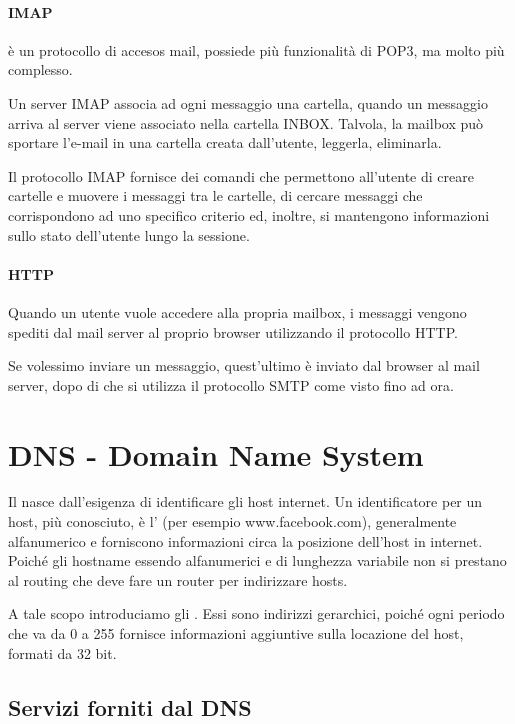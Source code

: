 \documentclass{book}
\newcommand{\tmtextbf}[1]{\text{{\bfseries{#1}}}}
\begin{document}
\paragraph{IMAP}

\tmtextbf{IMAP} {\`e} un protocollo di accesos mail, possiede pi{\`u}
funzionalit{\`a} di POP3, ma molto pi{\`u} complesso.

Un server IMAP associa ad ogni messaggio una cartella, quando un messaggio
arriva al server viene associato nella cartella INBOX. Talvola, la mailbox
pu{\`o} sportare l'e-mail in una cartella creata dall'utente, leggerla,
eliminarla.

Il protocollo IMAP fornisce dei comandi che permettono all'utente di creare
cartelle e muovere i messaggi tra le cartelle, di cercare messaggi che
corrispondono ad uno specifico criterio ed, inoltre, si mantengono
informazioni sullo stato dell'utente lungo la sessione.

\paragraph{HTTP}

Quando un utente vuole accedere alla propria mailbox, i messaggi vengono
spediti dal mail server al proprio browser utilizzando il protocollo HTTP.

Se volessimo inviare un messaggio, quest'ultimo {\`e} inviato dal browser al
mail server, dopo di che si utilizza il protocollo SMTP come visto fino ad
ora.

\section{DNS - Domain Name System}

Il \tmtextbf{DNS} nasce dall'esigenza di identificare gli host internet. Un
identificatore per un host, pi{\`u} conosciuto, {\`e} l'\tmtextbf{hostname}
(per esempio www.facebook.com), generalmente alfanumerico e forniscono
informazioni circa la posizione dell'host in internet. Poich{\'e} gli hostname
essendo alfanumerici e di lunghezza variabile non si prestano al routing che
deve fare un router per indirizzare hosts.

A tale scopo introduciamo gli \tmtextbf{indirizzi IP}. Essi sono indirizzi
gerarchici, poich{\'e} ogni periodo che va da 0 a 255 fornisce informazioni
aggiuntive sulla locazione del host, formati da 32 bit.

\subsection{Servizi forniti dal DNS}
\end{document}
